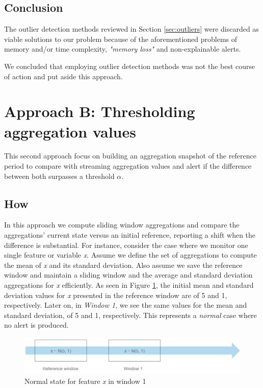 \subsection*{Conclusion}
The outlier detection methods reviewed in Section \ref{sec:outliers} were discarded as viable solutions to our problem because of the aforementioned problems of memory and/or time complexity, \textit{"memory loss"} and non-explainable alerts.

We concluded that employing outlier detection methods was not the best course of action and put aside this approach.

\section{Approach B: Thresholding aggregation values}
This second approach focus on building an aggregation snapshot of the reference period to compare with streaming aggregation values and alert if the difference between both surpasses a threshold $\alpha$.

\subsection*{How}

In this approach we compute sliding window aggregations and compare the aggregations’ current state versus an initial reference, reporting a shift when the difference is substantial. For instance, consider the case where we monitor one single feature or variable \textit{x}. Assume we define the set of aggregations to compute the mean of \textit{x} and its standard deviation. Also assume we save the reference window and maintain a sliding window and the average and standard deviation aggregations for \textit{x} efficiently. As seen in Figure \ref{fig:approach2-initial-state}, the initial mean and standard deviation values for \textit{x} presented in the reference window are of 5 and 1, respectively. Later on, in \textit{Window 1}, we see the same values for the mean and standard deviation, of 5 and 1, respectively. This represents a \textit{normal} case where no alert is produced.

\begin{figure}[!htb]
    \begin{center}
      \includegraphics[scale=0.65]{figures/approach2-normality.png}
      \caption[]{Normal state for feature \textit{x} in window 1}
      \label{fig:approach2-initial-state}
    \end{center}
\end{figure}


